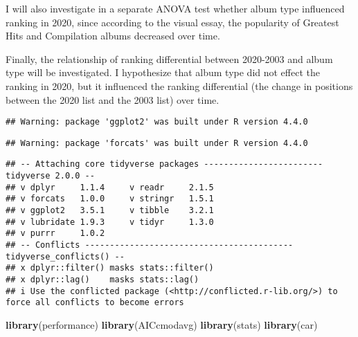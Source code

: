 \documentclass[
]{article}
\newenvironment{Shaded}{\begin{snugshade}}{\end{snugshade}}
\newcommand{\AttributeTok}[1]{\textcolor[rgb]{0.13,0.29,0.53}{#1}}
\newcommand{\ConstantTok}[1]{\textcolor[rgb]{0.56,0.35,0.01}{#1}}
\newcommand{\FunctionTok}[1]{\textcolor[rgb]{0.13,0.29,0.53}{\textbf{#1}}}
\newcommand{\NormalTok}[1]{#1}
\newcommand{\SpecialCharTok}[1]{\textcolor[rgb]{0.81,0.36,0.00}{\textbf{#1}}}
\begin{document}
I will also investigate in a separate ANOVA test whether album type
influenced ranking in 2020, since according to the visual essay, the
popularity of Greatest Hits and Compilation albums decreased over time.

Finally, the relationship of ranking differential between 2020-2003 and
album type will be investigated. I hypothesize that album type did not
effect the ranking in 2020, but it influenced the ranking differential
(the change in positions between the 2020 list and the 2003 list) over
time.

\begin{Shaded}
\end{Shaded}

\begin{verbatim}
## Warning: package 'ggplot2' was built under R version 4.4.0
\end{verbatim}

\begin{verbatim}
## Warning: package 'forcats' was built under R version 4.4.0
\end{verbatim}

\begin{verbatim}
## -- Attaching core tidyverse packages ------------------------ tidyverse 2.0.0 --
## v dplyr     1.1.4     v readr     2.1.5
## v forcats   1.0.0     v stringr   1.5.1
## v ggplot2   3.5.1     v tibble    3.2.1
## v lubridate 1.9.3     v tidyr     1.3.0
## v purrr     1.0.2     
## -- Conflicts ------------------------------------------ tidyverse_conflicts() --
## x dplyr::filter() masks stats::filter()
## x dplyr::lag()    masks stats::lag()
## i Use the conflicted package (<http://conflicted.r-lib.org/>) to force all conflicts to become errors
\end{verbatim}

\begin{Shaded}
\begin{Highlighting}[]
\FunctionTok{library}\NormalTok{(performance)}
\FunctionTok{library}\NormalTok{(AICcmodavg)}
\FunctionTok{library}\NormalTok{(stats)}
\FunctionTok{library}\NormalTok{(car)}
\end{Highlighting}
\end{Shaded}
\end{document}
